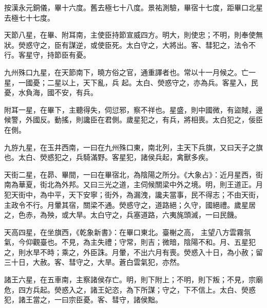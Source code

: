 \begin{pinyinscope}
 按漢永元銅儀，畢十六度。舊去極七十八度。景祐測驗，畢宿十七度，距畢口北星去極七十七度。



 天節八星，在畢、附耳南，主使臣持節宣威四方。明大，則使忠；不明，則奉使無狀。熒惑守之，臣有謀逆，或使臣死。太白守之，大將出。客、彗犯之，法令不行。客星守，持節臣有憂。



 九州殊口九星，在天節南下，曉方俗之官，通重譯者也。常以十一月候之。亡一星，一國憂；二星以上，天下亂，兵
 起。太白、熒惑守之，亦為兵。客星入，民憂，水負海，國不安，有兵。



 附耳一星，在畢下，主聽得失，伺愆邪，察不祥也。星盛，則中國微，有盜賊，邊候警，外國反。動搖，則讒臣在君側。歲星犯之，有兵，將相喪。太白犯之，佞臣在側。



 九斿九星，在玉井西南，一曰在九州殊口東，南北列，主天下兵旗，又曰天子之旗也。太白、熒惑犯之，兵騎滿野。客星犯，諸侯兵起，禽獸多疾。



 天街二星，在昴、畢間，一曰在畢宿北，為陰陽之所分。《大象占》：近月星西，街南為華夏，街北為外邦。又曰三光之道，主伺候關梁中外之境。明，則王道正。月犯天街中，為中平，天下安寧；街外，為漏洩，讒夫當事，民不得志；不由天街，主政令不行。月暈其宿，關梁不通。熒惑守之，道路絕；久守，國絕禮。歲星居之，色赤，為殃，或大旱。太白守之，兵塞道路，六夷旄頭滅，一曰民饑。



 天高四星，在坐旗西，《乾象新書》：在畢口東北。臺榭之高，
 主望八方雲霧氛氣，今仰觀臺也。不見，為主失禮；守常，則吉；微暗，陰陽不和。月、五星犯之，則水旱不時；乘之，外臣誅。月暈，不出六月有喪。熒惑入十日，為小赦；留三十日，大赦。客、彗守之，大旱。蒼白雲氣犯，亦然。



 諸王六星，在五車南，主察諸侯存亡。明，則下附上；不明，則下叛；不見，宗廟危，四方兵起。熒惑入之，諸王妃恣，為下所謀；守之，下不信上。太白、熒惑犯，諸王當之，一曰宗臣憂。客、彗守，諸侯黜。




\end{pinyinscope}
